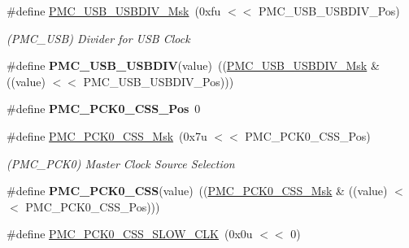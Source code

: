 \begin{DoxyCompactItemize}
\mbox{\label{group__SAMS70__PMC_gabb062c3f15ab096e8ea86a30d4ba7293}} 
\#define \mbox{\hyperlink{group__SAMS70__PMC_gabb062c3f15ab096e8ea86a30d4ba7293}{P\+M\+C\+\_\+\+U\+S\+B\+\_\+\+U\+S\+B\+D\+I\+V\+\_\+\+Msk}}~(0xfu $<$$<$ P\+M\+C\+\_\+\+U\+S\+B\+\_\+\+U\+S\+B\+D\+I\+V\+\_\+\+Pos)
\begin{DoxyCompactList}\small\item\em (P\+M\+C\+\_\+\+U\+SB) Divider for U\+SB Clock \end{DoxyCompactList}\item 
\mbox{\label{group__SAMS70__PMC_ga3cfa88f5a6b2b7603b3edf9672e5a7f3}} 
\#define {\bfseries P\+M\+C\+\_\+\+U\+S\+B\+\_\+\+U\+S\+B\+D\+IV}(value)~((\mbox{\hyperlink{group__SAMV71__PMC_gabb062c3f15ab096e8ea86a30d4ba7293}{P\+M\+C\+\_\+\+U\+S\+B\+\_\+\+U\+S\+B\+D\+I\+V\+\_\+\+Msk}} \& ((value) $<$$<$ P\+M\+C\+\_\+\+U\+S\+B\+\_\+\+U\+S\+B\+D\+I\+V\+\_\+\+Pos)))
\item 
\mbox{\label{group__SAMS70__PMC_ga123e033a99a5dc3f37e303c79c99bb62}} 
\#define {\bfseries P\+M\+C\+\_\+\+P\+C\+K0\+\_\+\+C\+S\+S\+\_\+\+Pos}~0
\item 
\mbox{\label{group__SAMS70__PMC_gaa1aea1bbd07412e65accdabcabb283a0}} 
\#define \mbox{\hyperlink{group__SAMS70__PMC_gaa1aea1bbd07412e65accdabcabb283a0}{P\+M\+C\+\_\+\+P\+C\+K0\+\_\+\+C\+S\+S\+\_\+\+Msk}}~(0x7u $<$$<$ P\+M\+C\+\_\+\+P\+C\+K0\+\_\+\+C\+S\+S\+\_\+\+Pos)
\begin{DoxyCompactList}\small\item\em (P\+M\+C\+\_\+\+P\+C\+K0) Master Clock Source Selection \end{DoxyCompactList}\item 
\mbox{\label{group__SAMS70__PMC_ga5cc5d6ab864c1d0b7a8e26de1591a8c3}} 
\#define {\bfseries P\+M\+C\+\_\+\+P\+C\+K0\+\_\+\+C\+SS}(value)~((\mbox{\hyperlink{group__SAMS70__PMC_gaa1aea1bbd07412e65accdabcabb283a0}{P\+M\+C\+\_\+\+P\+C\+K0\+\_\+\+C\+S\+S\+\_\+\+Msk}} \& ((value) $<$$<$ P\+M\+C\+\_\+\+P\+C\+K0\+\_\+\+C\+S\+S\+\_\+\+Pos)))
\item 
\mbox{\label{group__SAMS70__PMC_ga325db89c0940a33507a9e257ece08d8d}} 
\#define \mbox{\hyperlink{group__SAMS70__PMC_ga325db89c0940a33507a9e257ece08d8d}{P\+M\+C\+\_\+\+P\+C\+K0\+\_\+\+C\+S\+S\+\_\+\+S\+L\+O\+W\+\_\+\+C\+LK}}~(0x0u $<$$<$ 0)
$$
\end{DoxyCompactItemize}
